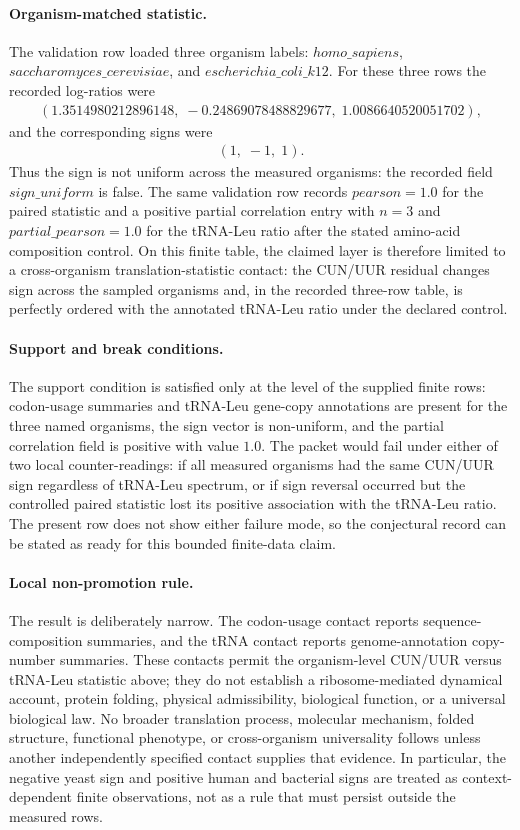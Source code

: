 \paragraph{Organism-matched statistic.}
The validation row loaded three organism labels: $homo\_sapiens$, $saccharomyces\_cerevisiae$, and $escherichia\_coli\_k12$.  For these three rows the recorded log-ratios were
$$
\begin{aligned}
(1.3514980212896148,\;-0.24869078488829677,\;1.0086640520051702),
\end{aligned}
$$
and the corresponding signs were
$$
\begin{aligned}
(1,\;-1,\;1).
\end{aligned}
$$
Thus the sign is not uniform across the measured organisms: the recorded field $sign\_uniform$ is false.  The same validation row records $pearson=1.0$ for the paired statistic and a positive partial correlation entry with $n=3$ and $partial\_pearson=1.0$ for the tRNA-Leu ratio after the stated amino-acid composition control.  On this finite table, the claimed layer is therefore limited to a cross-organism translation-statistic contact: the CUN/UUR residual changes sign across the sampled organisms and, in the recorded three-row table, is perfectly ordered with the annotated tRNA-Leu ratio under the declared control.

\paragraph{Support and break conditions.}
The support condition is satisfied only at the level of the supplied finite rows: codon-usage summaries and tRNA-Leu gene-copy annotations are present for the three named organisms, the sign vector is non-uniform, and the partial correlation field is positive with value $1.0$.  The packet would fail under either of two local counter-readings: if all measured organisms had the same CUN/UUR sign regardless of tRNA-Leu spectrum, or if sign reversal occurred but the controlled paired statistic lost its positive association with the tRNA-Leu ratio.  The present row does not show either failure mode, so the conjectural record can be stated as ready for this bounded finite-data claim.

\paragraph{Local non-promotion rule.}
The result is deliberately narrow.  The codon-usage contact reports sequence-composition summaries, and the tRNA contact reports genome-annotation copy-number summaries.  These contacts permit the organism-level CUN/UUR versus tRNA-Leu statistic above; they do not establish a ribosome-mediated dynamical account, protein folding, physical admissibility, biological function, or a universal biological law.  No broader translation process, molecular mechanism, folded structure, functional phenotype, or cross-organism universality follows unless another independently specified contact supplies that evidence.  In particular, the negative yeast sign and positive human and bacterial signs are treated as context-dependent finite observations, not as a rule that must persist outside the measured rows.


